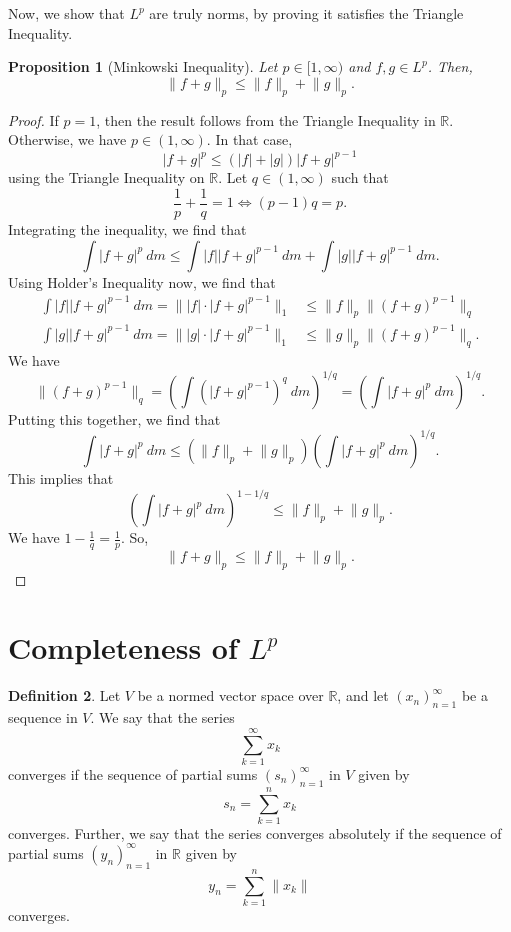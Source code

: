 \documentclass[a4paper, openany]{memoir}
\theoremstyle{definition}
\newtheorem{definition}{Definition}[section]
\theoremstyle{plain}
\newtheorem{proposition}[definition]{Proposition}
\begin{document}
    Now, we show that $L^p$ are truly norms, by proving it satisfies the Triangle Inequality.
    \begin{proposition}[Minkowski Inequality]
        Let $p \in [1, \infty)$ and $f, g \in L^p$. Then,
        \[\lVert f + g \rVert_p \leq \lVert f \rVert_p + \lVert g \rVert_p.\]
    \end{proposition}
    \begin{proof}
        If $p = 1$, then the result follows from the Triangle Inequality in $\mathbb{R}$. Otherwise, we have $p \in (1, \infty)$. In that case,
        \[|f + g|^p \leq (|f| + |g|)|f + g|^{p-1}\]
        using the Triangle Inequality on $\mathbb{R}$. Let $q \in (1, \infty)$ such that
        \[\frac{1}{p} + \frac{1}{q} = 1 \iff (p - 1)q = p.\]
        Integrating the inequality, we find that
        \[\int |f + g|^p \ dm \leq \int |f| |f + g|^{p-1} \ dm + \int |g| |f + g|^{p-1} \ dm.\]
        Using Holder's Inequality now, we find that
        \begin{align*}
            \int |f| |f + g|^{p-1} \ dm = \lVert |f| \cdot |f + g|^{p-1} \rVert_1 &\leq \lVert f \rVert_p \lVert (f + g)^{p-1} \rVert_q \\
            \int |g| |f + g|^{p-1} \ dm = \lVert |g| \cdot |f + g|^{p-1} \rVert_1 &\leq \lVert g \rVert_p \lVert (f + g)^{p-1} \rVert_q.
        \end{align*}
        We have
        \[\lVert (f + g)^{p-1} \rVert_q = \left(\int (|f + g|^{p-1})^q \ dm\right)^{1/q} = \left(\int |f+g|^p \ dm\right)^{1/q}.\]
        Putting this together, we find that
        \[\int |f + g|^p \ dm \leq (\lVert f \rVert_p + \lVert g \rVert_p)\left(\int |f+g|^p \ dm\right)^{1/q}.\]
        This implies that
        \[\left(\int |f + g|^p \ dm\right)^{1-1/q} \leq \lVert f \rVert_p + \lVert g \rVert_p.\]
        We have $1 - \frac{1}{q} = \frac{1}{p}$. So,
        \[\lVert f + g \rVert_p \leq \lVert f \rVert_p + \lVert g \rVert_p.\]
    \end{proof}
    \newpage

    \section{Completeness of $L^p$}
    \begin{definition}
        Let $V$ be a normed vector space over $\mathbb{R}$, and let $(x_n)_{n=1}^\infty$ be a sequence in $V$. We say that the series
        \[\sum_{k=1}^\infty x_k\]
        converges if the sequence of partial sums $(s_n)_{n=1}^\infty$ in $V$ given by
        \[s_n = \sum_{k=1}^n x_k\]
        converges. Further, we say that the series converges absolutely if the sequence of partial sums $(y_n)_{n=1}^\infty$ in $\mathbb{R}$ given by 
        \[y_n = \sum_{k=1}^n \lVert x_k \rVert\]
        converges.
    \end{definition}
\end{document}
